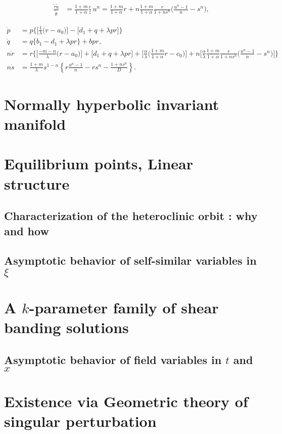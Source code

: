 \documentclass[a4paper,11pt]{article}
\def\tg{{\tilde{\gamma}}}
\def\tv{{\tilde{v}}}
\def\tth{{\tilde{\theta}}}
\def\ts{{\tilde{\tau}}}
\def\tu{{\tilde{u}}}
\def\dpp{\dot{p}}
\def\dqq{\dot{q}}
\def\drr{\dot{r}}
\begin{document}
\begin{align*}
 \frac{\ts\tu}{\tth} &= \frac{1+m}{1+\alpha} \frac{r}{z}\,u^n = \frac{1+m}{1+\alpha} r + n\frac{1+m}{1+\alpha} \frac{r}{1+ns^n}\Big(\frac{u^n-1}{n}-s^n\Big),%
\end{align*}





\begin{equation}
\begin{aligned}
  {\dpp}&=p\bigg\{\Big[\frac{1}{\lambda }\Big(r-a_0\Big)\Big] -\Big[d_1 + q + \lambda p r\Big]\bigg\}\\
  {\dqq}&=q\bigg\{b_1-d_1 + \lambda p r\bigg\} +bpr,\\
 n{\drr}&=r\bigg\{\Big[\frac{-m-n}{\lambda }\Big(r-a_0\Big)\Big]+\Big[d_1 + q + \lambda p r\Big]+\Big[\frac{\alpha}{\lambda }\Big(\frac{1+m}{1+\alpha}r-c_0\Big)\Big] + n\Big[\frac{\alpha}{\lambda }\frac{1+m}{1+\alpha} \frac{r}{1+ns^n}\Big(\frac{u^n-1}{n}-s^n\Big)\Big]\bigg\}\\
 n\dot{s}&=\frac{1+m}{\lambda}s^{1-n} \left\{r\frac{u^n-1}{n} - rs^n -\frac{1+ns^n}{D}\right\}.
\end{aligned}
\end{equation}

\section{Normally hyperbolic invariant manifold}
\section{Equilibrium points, Linear structure}
\subsection{Characterization of the heteroclinic orbit : why and how}
\subsection{Asymptotic behavior of self-similar variables in $\xi$}
\section{A $k$-parameter family of shear banding solutions}
\subsection{Asymptotic behavior of field variables in $t$ and $x$}
\section{Existence via Geometric theory of singular perturbation}
\end{document}
